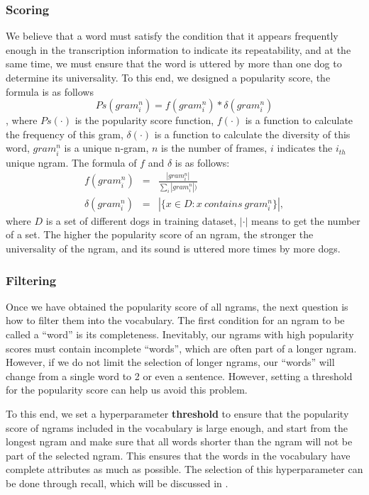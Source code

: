 \subsubsection{Scoring}

We believe that a word must satisfy the condition that it appears frequently enough in the transcription information to indicate its repeatability, and at the same time, we must ensure that the word is uttered by more than one dog to determine its universality. To this end, we designed a popularity score, the formula is as follows
$$Ps(gram^n_i) = f(gram^n_i) * \delta(gram^n_i)$$
, where $Ps(\cdot)$ is the popularity score function, $f(\cdot)$ is a function to calculate the frequency of this gram, $\delta(\cdot)$ is a function to calculate the diversity of this word, $gram^n_i$ is a unique n-gram, $n$ is the number of frames, $i$ indicates the $i_{th}$ unique ngram. The formula of $f$ and $\delta$ is as follows: 
\begin{eqnarray*}
f(gram^n_i) &=& \frac{\left | gram^n_i\right |}{\sum_{i}\left |gram^n_i\right |)}\\
\delta(gram^n_i) &=& \left |\{x\in D:x\ contains\ gram^n_i\}\right|,
\end{eqnarray*}
where $D$ is a set of different dogs in training dataset, $\left |\cdot \right |$ means to get the number of a set. 
The higher the popularity score of an ngram, the stronger the universality of the ngram, and its sound is uttered more times by more dogs.

\subsubsection{Filtering}

Once we have obtained the popularity score of all ngrams, the next question is how to filter them into the vocabulary. The first condition for an ngram to be called a ``word'' is its completeness. Inevitably, our ngrams with high popularity scores must contain incomplete ``words'', which are often part of a longer ngram. However, if we do not limit the selection of longer ngrams, our ``words'' will change from a single word to 2 or even a sentence. However, setting a threshold for the popularity score can help us avoid this problem. 

To this end, we set a hyperparameter \textbf{threshold} to ensure that the popularity score of ngrams included in the vocabulary is large enough, and start from the longest ngram and make sure that all words shorter than the ngram will not be part of the selected ngram. This ensures that the words in the vocabulary have complete attributes as much as possible. The selection of this hyperparameter can be done through recall, which will be discussed in .
